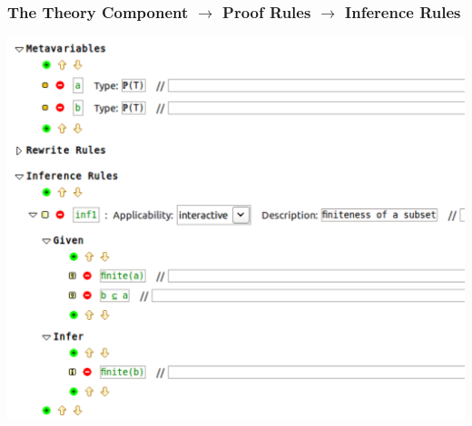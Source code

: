 \documentclass{beamer}
\begin{document}
	\begin{frame}
		\frametitle{The Theory Component $\rightarrow$ Proof Rules $\rightarrow$ Inference Rules}
		\begin{center}
			\includegraphics[scale=0.45]{InfRule}
		\end{center}
	\end{frame}
\end{document}
